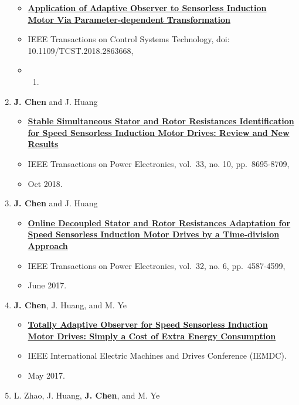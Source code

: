 \documentclass[]{article}
\providecommand{\tightlist}{%
  \setlength{\itemsep}{0pt}\setlength{\parskip}{0pt}}
\begin{document}
\begin{enumerate}
  \begin{itemize}
  \item
    \href{https://github.com/horychen/Publications/blob/master/2018-Chen.Huang-Application\%20EA\%2008454267.pdf}{\textbf{Application
    of Adaptive Observer to Sensorless Induction Motor Via
    Parameter-dependent Transformation}}
  \item
    IEEE Transactions on Control Systems Technology, doi:
    10.1109/TCST.2018.2863668,
  \item
    \begin{enumerate}
    \def\labelenumii{\arabic{enumii}.}
    \setcounter{enumii}{2018}
    \item
    \end{enumerate}
  \end{itemize}
\item
  \textbf{J. Chen} and J. Huang

  \begin{itemize}
  \tightlist
  \item
    \href{https://github.com/horychen/Publications/blob/master/2017-Chen.Huang-Stable\%20EMFState\%20Early\%20Access\%20Version.pdf}{\textbf{Stable
    Simultaneous Stator and Rotor Resistances Identification for Speed
    Sensorless Induction Motor Drives: Review and New Results}}
  \item
    IEEE Transactions on Power Electronics, vol.~33, no. 10,
    pp.~8695-8709,
  \item
    Oct 2018.
  \end{itemize}
\item
  \textbf{J. Chen} and J. Huang

  \begin{itemize}
  \tightlist
  \item
    \href{https://github.com/horychen/Publications/blob/master/2017-Chen.Huang-Online\%20EA.pdf}{\textbf{Online
    Decoupled Stator and Rotor Resistances Adaptation for Speed
    Sensorless Induction Motor Drives by a Time-division Approach}}
  \item
    IEEE Transactions on Power Electronics, vol.~32, no. 6,
    pp.~4587-4599,
  \item
    June 2017.
  \end{itemize}
\item
  \textbf{J. Chen}, J. Huang, and M. Ye

  \begin{itemize}
  \tightlist
  \item
    \href{https://github.com/horychen/Publications/blob/master/2017-Chen.Huang.ea-Totally.pdf}{\textbf{Totally
    Adaptive Observer for Speed Sensorless Induction Motor Drives:
    Simply a Cost of Extra Energy Consumption}}
  \item
    IEEE International Electric Machines and Drives Conference (IEMDC).
  \item
    May 2017.
  \end{itemize}
\item
  L. Zhao, J. Huang, \textbf{J. Chen}, and M. Ye


\end{enumerate}
\end{document}
